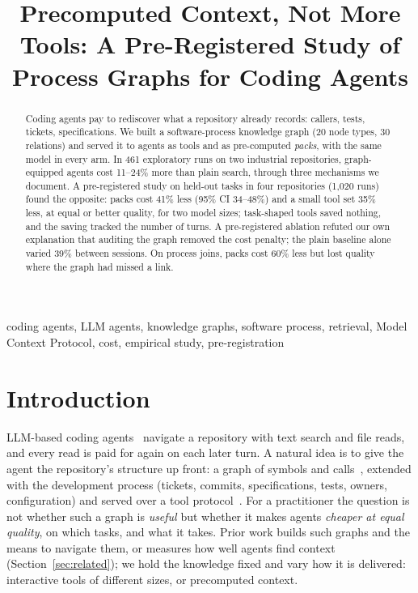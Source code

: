 \documentclass[conference]{IEEEtran}
\newif\ifanon
\begin{document}
\title{Precomputed Context, Not More Tools: A Pre-Registered Study of Process Graphs for Coding Agents}

\ifanon
\author{\IEEEauthorblockN{Anonymous author(s)}\IEEEauthorblockA{Anonymous institution}}
\else
\author{}
\fi

\maketitle

\begin{abstract}
Coding agents pay to rediscover what a repository already records: callers, tests, tickets, specifications. We built
a software-process knowledge graph (20 node types, 30 relations) and served it to agents as tools and as pre-computed
\emph{packs}, with the same model in every arm. In 461 exploratory runs on two industrial repositories, graph-equipped
agents cost 11--24\% more than plain search, through three mechanisms we document. A pre-registered study on
\confTasks{} held-out tasks in four repositories (1,020 runs) found the opposite: packs cost 41\% less (95\% CI
34--48\%) and a small tool set 35\% less, at equal or better quality, for two model sizes; task-shaped tools saved
nothing, and the saving tracked the number of turns. A pre-registered ablation refuted our own explanation that
auditing the graph removed the cost penalty; the plain baseline alone varied 39\% between sessions. On process joins,
packs cost 60\% less but lost quality where the graph had missed a link.
\end{abstract}

\begin{IEEEkeywords}
coding agents, LLM agents, knowledge graphs, software process, retrieval, Model Context Protocol, cost, empirical study, pre-registration
\end{IEEEkeywords}

\section{Introduction}
LLM-based coding agents~\cite{jimenez2024swebench,yang2024sweagent} navigate a repository with
text search and file reads, and every read is paid for again on each later turn. A natural idea is to give the agent
the repository's structure up front: a graph of symbols and calls~\cite{liu2024codexgraph,ouyang2025repograph},
extended with the development process (tickets, commits, specifications, tests, owners, configuration) and served over
a tool protocol~\cite{mcp2024}. For a practitioner the question is not whether such a graph is \emph{useful} but whether
it makes agents \emph{cheaper at equal quality}, on which tasks, and what it takes. Prior work builds such graphs and
the means to navigate them, or measures how well agents find context (Section~\ref{sec:related}); we hold the knowledge
fixed and vary how it is delivered: interactive tools of different sizes, or precomputed context.
\end{document}

